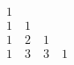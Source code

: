 \documentclass[preview]{standalone}
\begin{document}
\begin{align*}
\begin{matrix} 1 \\ 1 \quad 1 \\ 1 \quad 2 \quad 1 \\ 1 \quad 3 \quad 3 \quad 1 \end{matrix}
\end{align*}
\end{document}
